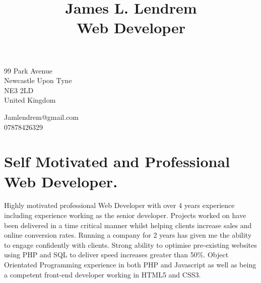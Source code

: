 \documentclass[10pt]{article}
\title{\bfseries\Huge James L. Lendrem \\ Web Developer}
\date{}
\begin{document}
\maketitle

\begin{minipage}[t]{0.48\textwidth}
99 Park Avenue\\
Newcastle Upon Tyne\\
NE3 2LD\\
United Kingdom
\end{minipage}
\begin{minipage}[t]{0.48\textwidth}
\begin{flushright}
Jamlendrem@gmail.com\\
07878426329
\end{flushright}
\end{minipage}

\newcommand\VRule{\color{lightgray}\vrule width 0.5pt}

\section*{Self Motivated and Professional Web Developer.}
Highly motivated professional Web Developer with over 4 years experience including experience working as the senior developer. Projects worked on have been delivered in a time critical manner whilst helping clients increase sales and online conversion rates. Running a company for 2 years has given me the ability to engage confidently with clients. Strong ability to optimise pre-existing websites using PHP and SQL to deliver speed increases greater than 50\%. Object Orientated Programming experience in both PHP and Javascript as well as being a competent front-end developer working in HTML5 and CSS3.
\end{document}
